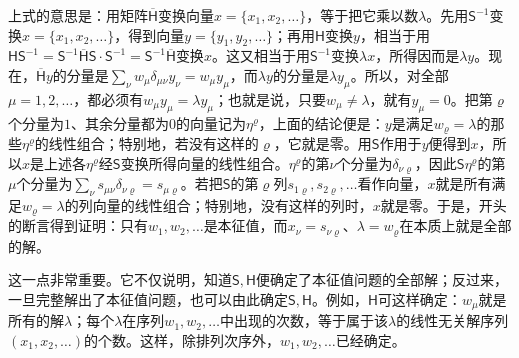 \documentclass[fontsize=13pt,twoside,openany,headings=normal,parskip=false,bookmarkpackage=false,DIV=calc]{scrbook}
\begin{document}
上式的意思是：用矩阵$\overline{\mathsf{H}}$变换向量$x=\{x_1,\allowbreak x_2,\allowbreak \ldots\}$，等于把它乘以数$\lambda$。先用$\mathsf{S}^{-1}$变换$x=\{x_1,\allowbreak x_2,\allowbreak \ldots\}$，得到向量$y=\{y_1,\allowbreak y_2,\allowbreak \ldots\}$；再用$\mathsf{H}$变换$y$，相当于用$\mathsf{H}\mathsf{S}^{-1}=\mathsf{S}^{-1}\overline{\mathsf{H}}\mathsf{S}\cdot\mathsf{S}^{-1}=\mathsf{S}^{-1}\overline{\mathsf{H}}$变换$x$。这又相当于用$\mathsf{S}^{-1}$变换$\lambda x$，所得因而是$\lambda y$。现在，$\overline{\mathsf{H}}y$的分量是$\sum_\nu w_\mu\delta_{\mu\nu}y_\nu=w_\mu y_\mu$，而$\lambda y$的分量是$\lambda y_\mu$。所以，对全部$\mu=1,\allowbreak 2,\allowbreak \ldots$，都必须有$w_\mu y_\mu=\lambda y_\mu$；也就是说，只要$w_\mu\ne\lambda$，就有$y_\mu=0$。把第$\varrho$个分量为$1$、其余分量都为$0$的向量记为$\eta^\varrho$，上面的结论便是：$y$是满足$w_\varrho=\lambda$的那些$\eta^\varrho$的线性组合；特别地，若没有这样的$\varrho$，它就是零。用$\mathsf{S}$作用于$y$便得到$x$，所以$x$是上述各$\eta^\varrho$经$\mathsf{S}$变换所得向量的线性组合。$\eta^\varrho$的第$\nu$个分量为$\delta_{\nu\varrho}$，因此$\mathsf{S}\eta^\varrho$的第$\mu$个分量为$\sum_\nu s_{\mu\nu}\delta_{\nu\varrho}=s_{\mu\varrho}$。若把$\mathsf{S}$的第$\varrho$列$s_{1\varrho},\allowbreak s_{2\varrho},\allowbreak \ldots$看作向量，$x$就是所有满足$w_\varrho=\lambda$的列向量的线性组合；特别地，没有这样的列时，$x$就是零。于是，开头的断言得到证明：只有$w_1,\allowbreak w_2,\allowbreak \ldots$是本征值，而$x_\nu=s_{\nu\varrho}$、$\lambda=w_\varrho$在本质上就是全部的解。

这一点非常重要。它不仅说明，知道$\mathsf{S},\allowbreak \mathsf{H}$便确定了本征值问题的全部解；反过来，一旦完整解出了本征值问题，也可以由此确定$\mathsf{S},\allowbreak \mathsf{H}$。例如，$\mathsf{H}$可这样确定：$w_\mu$就是所有的解$\lambda$；每个$\lambda$在序列$w_1,\allowbreak w_2,\allowbreak \ldots$中出现的次数，等于属于该$\lambda$的线性无关解序列$(x_1,\allowbreak x_2,\allowbreak \ldots)$的个数。\hypertarget{origpage-12}{}\label{origpage-12}这样，除排列次序外，$w_1,\allowbreak w_2,\allowbreak \ldots$已经确定。
\end{document}
